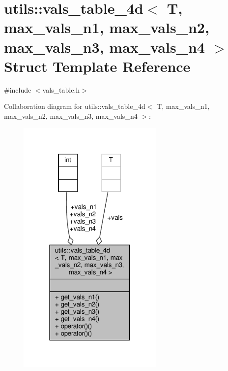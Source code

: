 \hypertarget{structutils_1_1vals__table__4d}{\section{utils\-:\-:vals\-\_\-table\-\_\-4d$<$ T, max\-\_\-vals\-\_\-n1, max\-\_\-vals\-\_\-n2, max\-\_\-vals\-\_\-n3, max\-\_\-vals\-\_\-n4 $>$ Struct Template Reference}
\label{structutils_1_1vals__table__4d}
}


{\ttfamily \#include $<$vals\-\_\-table.\-h$>$}



Collaboration diagram for utils\-:\-:vals\-\_\-table\-\_\-4d$<$ T, max\-\_\-vals\-\_\-n1, max\-\_\-vals\-\_\-n2, max\-\_\-vals\-\_\-n3, max\-\_\-vals\-\_\-n4 $>$\-:
\nopagebreak
\begin{figure}[H]
\begin{center}
\leavevmode
\includegraphics[width=202pt]{structutils_1_1vals__table__4d__coll__graph}
\end{center}
\end{figure}
